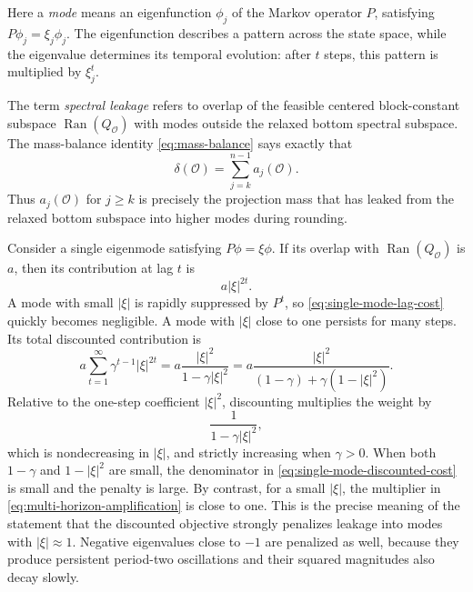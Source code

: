 \documentclass[11pt]{article}
\newcommand{\1}{\mathbf{1}}
\begin{document}
Here a \emph{mode} means an eigenfunction $\phi_j$ of the Markov
operator $P$, satisfying $P\phi_j=\xi_j\phi_j$.  The eigenfunction
describes a pattern across the state space, while the eigenvalue
determines its temporal evolution: after $t$ steps, this pattern is
multiplied by $\xi_j^t$.  

The term \emph{spectral leakage} refers to overlap of the feasible
centered block-constant subspace
$\operatorname{Ran}(Q_{\mathcal O})$ with modes outside the relaxed
bottom spectral subspace.  The mass-balance identity
\eqref{eq:mass-balance} says exactly that
\[
    \delta(\mathcal O)
    =\sum_{j=k}^{n-1}a_j(\mathcal O).
\]
Thus $a_j(\mathcal O)$ for $j\geq k$ is precisely the projection mass
that has leaked from the relaxed bottom subspace into higher modes
during rounding.

Consider a single eigenmode satisfying $P\phi=\xi\phi$.  If its
overlap with $\operatorname{Ran}(Q_{\mathcal O})$ is $a$, then its
contribution at lag $t$ is
\begin{equation}
    a|\xi|^{2t}.
    \label{eq:single-mode-lag-cost}
\end{equation}
A mode with small $|\xi|$ is rapidly suppressed by $P^t$, so
\eqref{eq:single-mode-lag-cost} quickly becomes negligible.  A mode
with $|\xi|$ close to one persists for many steps.  Its total
discounted contribution is
\begin{equation}
    a\sum_{t=1}^\infty
       \gamma^{t-1}|\xi|^{2t}
    =a\frac{|\xi|^2}{1-\gamma|\xi|^2}
    =a\frac{|\xi|^2}
      {(1-\gamma)+\gamma(1-|\xi|^2)}.
    \label{eq:single-mode-discounted-cost}
\end{equation}
Relative to the one-step coefficient $|\xi|^2$, discounting
multiplies the weight by
\begin{equation}
    \frac1{1-\gamma|\xi|^2},
    \label{eq:multi-horizon-amplification}
\end{equation}
which is nondecreasing in $|\xi|$, and strictly increasing when $\gamma > 0$.  When both $1-\gamma$ and
$1-|\xi|^2$ are small, the denominator in
\eqref{eq:single-mode-discounted-cost} is small and the penalty is
large.  By contrast, for a small $|\xi|$, the multiplier in
\eqref{eq:multi-horizon-amplification} is close to one.  This is the
precise meaning of the statement that the discounted objective
strongly penalizes leakage into modes with $|\xi|\approx1$.
Negative eigenvalues close to $-1$ are penalized as well, because
they produce persistent period-two oscillations and their squared
magnitudes also decay slowly.
\end{document}
